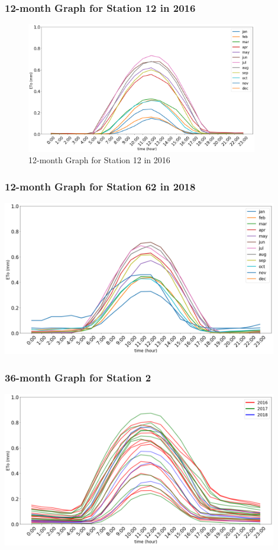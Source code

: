 \begin{frame}
\frametitle{12-month Graph for Station 12 in 2016}
\centering
\begin{figure}
\includegraphics[width=0.9\textwidth]{images/12-2016.png}
\caption{12-month Graph for Station 12 in 2016}\label{fig:12-2016}
\end{figure}
\end{frame}

\begin{frame}
\frametitle{12-month Graph for Station 62 in 2018}
\centering
\includegraphics[width=0.9\textwidth]{images/62-2018.png}
\end{frame}

\begin{frame}
\frametitle{36-month Graph for Station 2}
\centering
\includegraphics[width=0.9\textwidth]{images/234multi.png}
\end{frame}



